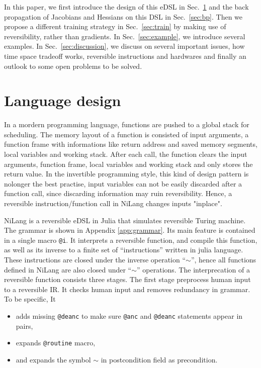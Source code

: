\documentclass[aps,twocolumn,longbibliography,english,superscriptaddress,prr]{revtex4-1}
\newcommand{\<}{\langle}
\renewcommand{\>}{\rangle}
\newcommand{\Sec}[1]{Sec.~\ref{#1}}
\newcommand{\App}[1]{Appendix \ref{#1}}
\theoremstyle{definition}\newtheorem{definition}{\textit{Definition}}
\begin{document}
    In this paper, we first introduce the design of this eDSL in \Sec{sec:lang} and the back propagation of Jacobians and Hessians on this DSL in \Sec{sec:bp}.
    Then we propose a different training strategy in \Sec{sec:train} by making use of reversibility, rather than gradients.
    In \Sec{sec:example}, we introduce several examples.
    In \Sec{sec:discussion}, we discuss on several important issues, how time space tradeoff works, reversible instructions and hardwares and finally an outlook to some open problems to be solved.

    \section{Language design}\label{sec:lang}
In a mordern programming language, functions are pushed to a global stack for scheduling. The memory layout of a function is consisted of input arguments, a function frame with informations like return address and saved memory segments, local variables and working stack. After each call, the function clears the input arguments, function frame, local variables and working stack and only stores the return value.
In the invertible programming style, this kind of design pattern is nolonger the best practise, input variables can not be easily discarded after a function call, since discarding information may ruin reversibility. Hence, a reversible instruction/function call in NiLang changes inputs "inplace".

NiLang is a reversible eDSL in Julia that simulates reversible Turing machine. The grammar is shown in \App{app:grammar}.
Its main feature is contained in a single macro \texttt{@i}. It interprets a reversible function, and compile this function, as well as its inverse to a finite set of ``instructions'' written in julia language. These instructions are closed under the inverse operation ``$\sim$'', hence all functions defined in NiLang are also closed under ``$\sim$'' operations.
The interprecation of a reversible function consists three stages.
The first stage preprocess human input to a reversible IR. It checks human input and removes redundancy in grammar. To be specific, It
\begin{itemize}
    \item adds missing \texttt{@deanc} to make sure \texttt{@anc} and \texttt{@deanc} statements appear in pairs,
    \item expands \texttt{@routine} macro,
    \item and expands the symbol \texttt{$\sim$} in postcondition field as precondition.
\end{itemize}
\end{document}
